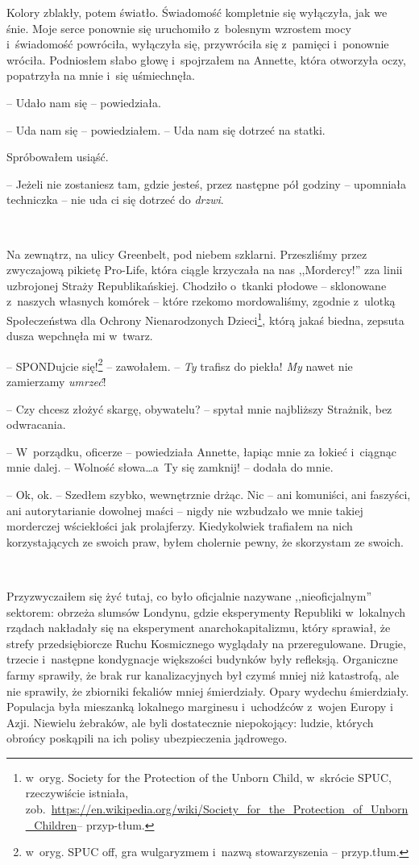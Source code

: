 \documentclass[oneside,polish,11pt,sfheadings]{mwbk}
\begin{document}
Kolory zblakły, potem światło. Świadomość kompletnie się wyłączyła, jak
we śnie. Moje serce ponownie się uruchomiło z~bolesnym wzrostem mocy i~świadomość powróciła, wyłączyła się, przywróciła się z~pamięci i~ponownie wróciła. Podniosłem słabo głowę i~spojrzałem na Annette, która
otworzyła oczy, popatrzyła na mnie i~się uśmiechnęła.

-- Udało nam się -- powiedziała.

-- Uda nam się -- powiedziałem. -- Uda nam się dotrzeć na statki.

Spróbowałem usiąść.

-- Jeżeli nie zostaniesz tam, gdzie jesteś, przez następne pół godziny -- upomniała techniczka -- nie uda ci się dotrzeć do \emph{drzwi}.

~

Na zewnątrz, na ulicy Greenbelt, pod niebem szklarni. Przeszliśmy przez
zwyczajową pikietę Pro-Life, która ciągle krzyczała na nas ,,Mordercy!''
zza linii uzbrojonej Straży Republikańskiej. Chodziło o~tkanki płodowe -- sklonowane z~naszych własnych komórek -- które rzekomo mordowaliśmy,
zgodnie z~ulotką Społeczeństwa dla Ochrony Nienarodzonych Dzieci\footnote{w~oryg. Society
for the Protection of the Unborn Child, w~skrócie SPUC, rzeczywiście
istniała,
zob.~\url{https://en.wikipedia.org/wiki/Society_for_the_Protection_of_Unborn_Children}-- przyp-tłum.}, którą
jakaś biedna, zepsuta dusza wepchnęła mi w~twarz. 

-- SPONDujcie się!\footnote{ w~oryg. SPUC off, gra wulgaryzmem i~nazwą stowarzyszenia -- przyp.tłum.}  -- zawołałem. -- \emph{Ty} trafisz do piekła!
\emph{My} nawet nie zamierzamy \emph{umrzeć}!

-- Czy chcesz złożyć skargę, obywatelu? -- spytał mnie najbliższy
Strażnik, bez odwracania.

-- W~porządku, oficerze -- powiedziała Annette, łapiąc mnie za łokieć i~ciągnąc mnie dalej. -- Wolność słowa\ldots a~Ty się zamknij! -- dodała do
mnie.

-- Ok, ok. -- Szedłem szybko, wewnętrznie drżąc. Nic -- ani komuniści, ani
faszyści, ani autorytarianie dowolnej maści -- nigdy nie wzbudzało we
mnie takiej morderczej wściekłości jak prolajferzy. Kiedykolwiek
trafiałem na nich korzystających ze swoich praw, byłem cholernie pewny,
że skorzystam ze swoich.

~

Przyzwyczaiłem się żyć tutaj, co było oficjalnie nazywane ,,nieoficjalnym''
sektorem: obrzeża slumsów Londynu, gdzie eksperymenty Republiki w~lokalnych rządach nakładały się na eksperyment anarchokapitalizmu, który
sprawiał, że strefy przedsiębiorcze Ruchu Kosmicznego wyglądały na
przeregulowane. Drugie, trzecie i~następne kondygnacje większości
budynków były refleksją. Organiczne farmy sprawiły, że brak rur
kanalizacyjnych był czymś mniej niż katastrofą, ale nie sprawiły, że
zbiorniki fekaliów mniej śmierdziały. Opary wydechu śmierdziały.
Populacja była mieszanką lokalnego marginesu i~uchodźców z~wojen Europy
i Azji. Niewielu żebraków, ale byli dostatecznie niepokojący: ludzie,
których obrońcy poskąpili na ich polisy ubezpieczenia jądrowego.
\end{document}
